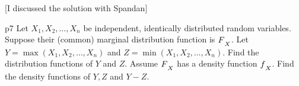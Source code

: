 \documentclass[a4paper, 11pt]{article}
\begin{document}
[I discussed the solution with Spandan]\parinn



\begin{problem}{%
	}{p7%
	}
Let $X_1,X_2,\dots, X_n$ be independent, identically distributed random variables. Suppose their (common) marginal distribution function is $F\strut_X$. Let $Y=\max(X_1,X_2,\dots, X_n)$ and $Z=\min (X_1,X_2,\dots, X_n)$. Find the distribution functions of $Y$ and $Z$. Assume $F\strut_X$ has a density function $f\strut_X$. Find the density functions of $Y,Z$ and $Y-Z$.
\end{problem}
\end{document}
